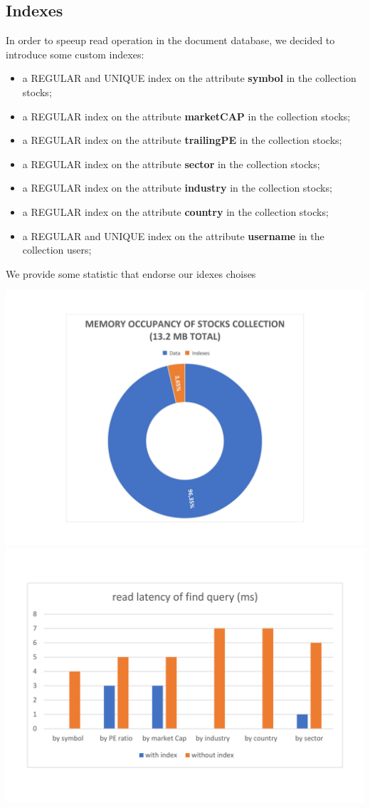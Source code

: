 \subsection{Indexes}
In order to speeup read operation in the document database, 
we decided to introduce some custom indexes:
\begin{itemize}
    \item a REGULAR and UNIQUE index on the attribute \textbf{symbol} in the collection stocks;
    \item a REGULAR index on the attribute \textbf{marketCAP} in the collection stocks;
    \item a REGULAR index on the attribute \textbf{trailingPE} in the collection stocks;
    \item a REGULAR index on the attribute \textbf{sector} in the collection stocks;
    \item a REGULAR index on the attribute \textbf{industry} in the collection stocks;
    \item a REGULAR index on the attribute \textbf{country} in the collection stocks;
    \item a REGULAR and UNIQUE index on the attribute \textbf{username} in the collection users;
\end{itemize}
We provide some statistic that endorse our idexes choises

\includegraphics[scale=0.07]{img/memory_mongo.png}
\includegraphics[scale=0.07]{img/latency_mongo.png}

